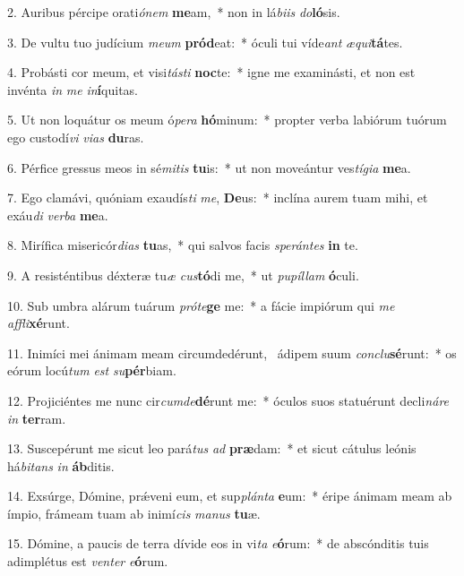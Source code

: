 2. Auribus pércipe orati\textit{ó}\textit{nem} \textbf{me}am,~*  non in lá\textit{bi}\textit{is} \textit{do}\textbf{ló}sis.\

3. De vultu tuo judícium \textit{me}\textit{um} \textbf{pród}eat:~*  óculi tui víde\textit{ant} \textit{æ}\textit{qui}\textbf{tá}tes.\

4. Probásti cor meum, et visi\textit{tás}\textit{ti} \textbf{noc}te:~*  igne me examinásti, et non est invénta \textit{in} \textit{me} \textit{in}\textbf{í}quitas.\

5. Ut non loquátur os meum ó\textit{pe}\textit{ra} \textbf{hó}minum:~*  propter verba labiórum tuórum ego custodí\textit{vi} \textit{vi}\textit{as} \textbf{du}ras.\

6. Pérfice gressus meos in sé\textit{mi}\textit{tis} \textbf{tu}is:~*  ut non moveántur ves\textit{tí}\textit{gi}\textit{a} \textbf{me}a.\

7. Ego clamávi, quóniam exaudís\textit{ti} \textit{me}, \textbf{De}us:~*  inclína aurem tuam mihi, et exáu\textit{di} \textit{ver}\textit{ba} \textbf{me}a.\

8. Mirífica misericór\textit{di}\textit{as} \textbf{tu}as,~*  qui salvos facis \textit{spe}\textit{rán}\textit{tes} \textbf{in} te.\

9. A resisténtibus déxteræ tu\textit{æ} \textit{cus}\textbf{tó}di me,~*  ut \textit{pu}\textit{píl}\textit{lam} \textbf{ó}culi.\

10. Sub umbra alárum tuárum \textit{pró}\textit{te}\textbf{ge} me:~*  a fácie impiórum qui \textit{me} \textit{af}\textit{fli}\textbf{xé}runt.\

11. Inimíci mei ánimam meam circumdedérunt, \dag\  ádipem suum \textit{con}\textit{clu}\textbf{sé}runt:~*  os eórum locú\textit{tum} \textit{est} \textit{su}\textbf{pér}biam.\

12. Projiciéntes me nunc cir\textit{cum}\textit{de}\textbf{dé}runt me:~*  óculos suos statuérunt decli\textit{ná}\textit{re} \textit{in} \textbf{ter}ram.\

13. Suscepérunt me sicut leo pará\textit{tus} \textit{ad} \textbf{præ}dam:~*  et sicut cátulus leónis há\textit{bi}\textit{tans} \textit{in} \textbf{áb}ditis.\

14. Exsúrge, Dómine, prǽveni eum, et sup\textit{plán}\textit{ta} \textbf{e}um:~*  éripe ánimam meam ab ímpio, frámeam tuam ab inimí\textit{cis} \textit{ma}\textit{nus} \textbf{tu}æ.\

15. Dómine, a paucis de terra dívide eos in vi\textit{ta} \textit{e}\textbf{ó}rum:~*  de abscónditis tuis adimplétus est \textit{ven}\textit{ter} \textit{e}\textbf{ó}rum.\

